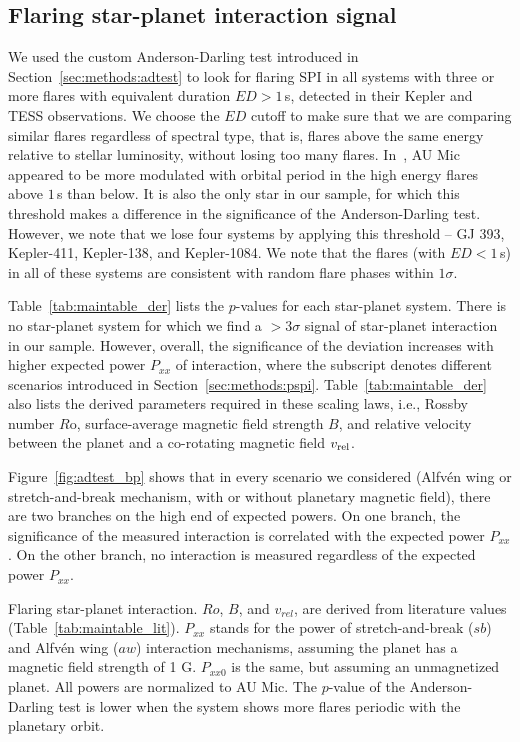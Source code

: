 \documentclass[twocolumn]{aastex631}
\begin{document}
\subsection{Flaring star-planet interaction signal}
\label{sec:results:spi}
We used the custom Anderson-Darling test introduced in Section~\ref{sec:methods:adtest} to look for flaring SPI in all systems with three or more flares with equivalent duration $ED>1\,$s, detected in their Kepler and TESS observations. We choose the $ED$ cutoff to make sure that we are comparing similar flares regardless of spectral type, that is, flares above the same energy relative to stellar luminosity, without losing too many flares. In~\citet{ilin2022searching}, AU Mic appeared to be more modulated with orbital period in the high energy flares above $1\,$s than below. It is also the only star in our sample, for which this threshold makes a difference in the significance of the Anderson-Darling test. However, we note that we lose four systems by applying this threshold -- GJ 393, Kepler-411, Kepler-138, and Kepler-1084. We note that the flares (with $ED<1\,$s) in all of these systems are consistent with random flare phases within $1\sigma$.

Table~\ref{tab:maintable_der} lists the $p$-values for each star-planet system. There is no star-planet system for which we find a $>3\sigma$ signal of star-planet interaction in our sample. However, overall, the significance of the deviation increases with higher expected power $P_{xx}$ of interaction, where the subscript denotes different scenarios introduced in Section~\ref{sec:methods:pspi}. Table~\ref{tab:maintable_der} also lists the derived parameters required in these scaling laws, i.e., Rossby number $R$o, surface-average magnetic field strength $B$, and relative velocity between the planet and a co-rotating magnetic field $v_{\rm rel}$. 

Figure~\ref{fig:adtest_bp} shows that in every scenario we considered (Alfv\'en wing or stretch-and-break mechanism, with or without planetary magnetic field), there are two branches on the high end of expected powers. On one branch, the significance of the measured interaction is correlated with the expected power $P_{xx}$. On the other branch, no interaction is measured regardless of the expected power $P_{xx}$. 



\begin{table*}
\footnotesize
\movetableright=-20mm
\caption{Flaring star-planet interaction. $Ro$, $B$, and $v_{rel}$, are derived from literature values (Table~\ref{tab:maintable_lit}). $P_{xx}$ stands for the power of stretch-and-break ($sb$) and Alfv\'en wing ($aw$) interaction mechanisms, assuming the planet has a magnetic field strength of 1 G. $P_{xx0}$ is the same, but assuming an unmagnetized planet. All powers are normalized to AU Mic. The $p$-value of the Anderson-Darling test is lower when the system shows more flares periodic with the planetary orbit.}

    \label{tab:maintable_der}

\end{table*}
\end{document}
